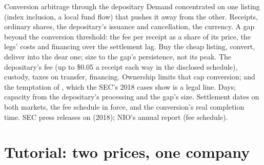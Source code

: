 \begin{strategyfile}{Conversion arbitrage through the depositary}\label{strat:hf:depositary-receipts-and-dual-listings:conversion}
 Demand concentrated on one listing (index inclusion, a local fund flow) that pushes it away from the other.
 Receipts, ordinary shares, the depositary's issuance and cancellation, the currency.
 A gap beyond the conversion threshold: the fee per receipt as a share of its price, the legs' costs and financing over the
settlement lag.
 Buy the cheap listing, convert, deliver into the dear one; size to the gap's persistence, not its peak.
 The depositary's fee (up to \$0.05 a receipt each way in the disclosed schedule), custody, taxes on transfer, financing.
 Ownership limits that cap conversion; and the temptation of , which the SEC's 2018 cases show is a legal line.
 Days; capacity from the depositary's processing and the gap's size.
 Settlement dates on both markets, the fee schedule in force, and the conversion's real completion time.
 SEC press releases on  (2018); NIO's annual report (fee schedule).
\end{strategyfile}

\section{Tutorial: two prices, one company}\label{tut:hf:depositary-receipts-and-dual-listings:tut}

